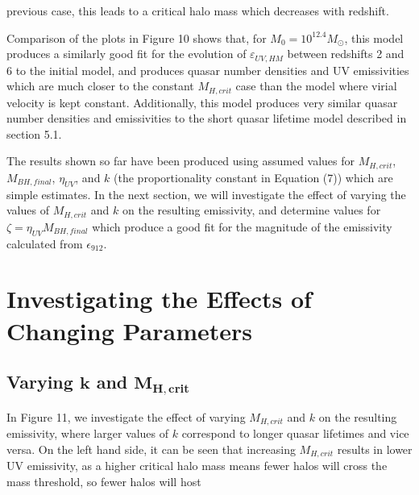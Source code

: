\documentclass[12pt, twocolumn]{article}%
\begin{document}
\twocolumngrid


\noindent previous case, this leads to a critical halo mass which decreases with redshift.\par

Comparison of the plots in Figure 10 shows that, for $M_0=10^{12.4}M_\odot$, this model produces a similarly good fit for the evolution of $\varepsilon_{UV,HM}$ between redshifts 2 and 6 to the initial model, and produces quasar number densities and UV emissivities which are much closer to the constant $M_{H,crit}$ case than the model where virial velocity is kept constant. Additionally, this model produces very similar quasar number densities and emissivities to the short quasar lifetime model described in section 5.1.

 The results shown so far have been produced using assumed values for $M_{H,crit}$, $M_{BH,final}$, $\eta_{UV}$, and $k$ (the proportionality constant in Equation (7)) which are simple estimates. In the next section, we will investigate the effect of varying the values of $M_{H,crit}$ and $k$ on the resulting emissivity, and determine values for $\zeta=\eta_{UV}M_{BH,final}$ which produce a good fit for the magnitude of the emissivity calculated from $\epsilon_{912}$.

 \section{Investigating the Effects of Changing Parameters}
 \subsection{Varying $\bm{k}$ and $\bm{M_{H,crit}}$}

In Figure 11, we investigate the effect of varying $M_{H,crit}$ and $k$ on the resulting emissivity, where larger values of $k$ correspond to longer quasar lifetimes and vice versa. On the left hand side, it can be seen that increasing $M_{H,crit}$ results in lower UV emissivity, as a higher critical halo mass means fewer halos will cross the mass threshold, so fewer halos will host

\onecolumngrid
\end{document}
